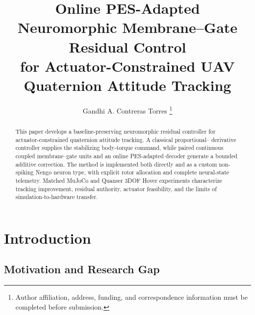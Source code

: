 \documentclass[letterpaper,10pt,conference]{ieeeconf}
\title{\LARGE \bf
Online PES-Adapted Neuromorphic Membrane--Gate Residual Control\\
for Actuator-Constrained UAV Quaternion Attitude Tracking
}
\author{Gandhi A. Contreras Torres%
\thanks{Author affiliation, address, funding, and correspondence information
must be completed before submission.}%
}
\begin{document}
\maketitle
\thispagestyle{empty}
\pagestyle{empty}

\begin{abstract}
This paper develops a baseline-preserving neuromorphic residual controller for
actuator-constrained quaternion attitude tracking. A classical proportional--
derivative controller supplies the stabilizing body-torque command, while
paired continuous coupled membrane--gate units and an online PES-adapted
decoder generate a bounded additive correction. The method is implemented
both directly and as a custom non-spiking Nengo neuron type, with explicit
rotor allocation and complete neural-state telemetry. Matched MuJoCo and
Quanser 3DOF Hover experiments characterize tracking improvement, residual
authority, actuator feasibility, and the limits of simulation-to-hardware
transfer.
\end{abstract}


\section{Introduction}
\label{sec:introduction}


\subsection{Motivation and Research Gap}

\end{document}

